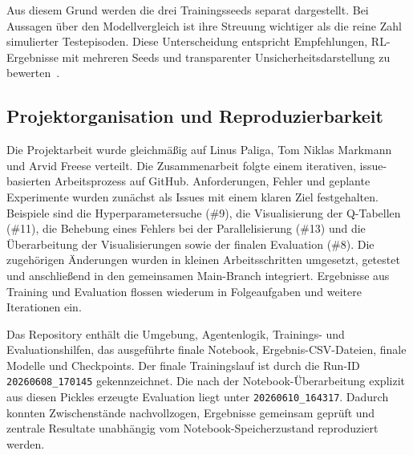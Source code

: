 Aus diesem Grund werden die drei Trainingsseeds separat dargestellt.
Bei Aussagen über den Modellvergleich ist ihre Streuung wichtiger als
die reine Zahl simulierter Testepisoden. Diese Unterscheidung
entspricht Empfehlungen, RL-Ergebnisse mit mehreren Seeds und
transparenter Unsicherheitsdarstellung zu bewerten~\cite{henderson2018matters}.

\subsection{Projektorganisation und Reproduzierbarkeit}

Die Projektarbeit wurde gleichmäßig auf Linus Paliga, Tom Niklas
Markmann und Arvid Freese verteilt. Die Zusammenarbeit folgte einem
iterativen, issue-basierten Arbeitsprozess auf GitHub. Anforderungen,
Fehler und geplante Experimente wurden zunächst als Issues mit einem
klaren Ziel festgehalten. Beispiele sind die Hyperparametersuche
(\#9), die Visualisierung der Q-Tabellen (\#11), die Behebung eines
Fehlers bei der Parallelisierung (\#13) und die Überarbeitung der
Visualisierungen sowie der finalen Evaluation (\#8). Die zugehörigen
Änderungen wurden in kleinen Arbeitsschritten umgesetzt, getestet und
anschließend in den gemeinsamen Main-Branch integriert. Ergebnisse
aus Training und Evaluation flossen wiederum in Folgeaufgaben und
weitere Iterationen ein.

Das Repository enthält die Umgebung, Agentenlogik, Trainings- und
Evaluationshilfen, das ausgeführte finale Notebook,
Ergebnis-CSV-Dateien, finale Modelle und Checkpoints. Der finale
Trainingslauf ist durch die Run-ID \texttt{20260608\_170145}
gekennzeichnet. Die nach der Notebook-Überarbeitung explizit aus
diesen Pickles erzeugte Evaluation liegt unter
\texttt{20260610\_164317}. Dadurch konnten Zwischenstände
nachvollzogen, Ergebnisse gemeinsam geprüft und zentrale Resultate
unabhängig vom Notebook-Speicherzustand reproduziert werden.
